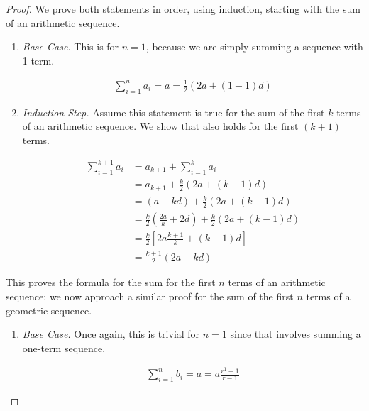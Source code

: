 \begin{proof}
	We prove both statements in order, using induction, starting with the sum of an arithmetic sequence.
	
	\vspace{\baselineskip}
	\begin{enumerate}
		\item \emph{Base Case.} This is for $n = 1$, because we are simply summing a sequence with 1 term.
		
		\begin{align*}
			\sum_{i = 1}^n a_i = a = \frac{1}{2} (2a + (1 - 1)d)
		\end{align*}
		
		\item \emph{Induction Step.} Assume this statement is true for the sum of the first $k$ terms of an arithmetic sequence. We show that also holds for the first $(k + 1)$ terms.
		
		\begin{align*}
			\sum_{i = 1}^{k + 1} a_i &=  a_{k + 1} + \sum_{i = 1}^k a_i \\
			&= a_{k + 1} + \frac{k}{2} \left( 2a + (k - 1)d \right) \\
			&= (a + kd) + \frac{k}{2} \left( 2a + (k - 1)d \right) \\
			&= \frac{k}{2} \left( \frac{2a}{k} + 2d \right) + \frac{k}{2} \left( 2a + (k - 1)d \right) \\
			&= \frac{k}{2} \left[ 2a \frac{k + 1}{k} + (k + 1)d
			 \right] \\
			&= \frac{k + 1}{2} \left( 2a + kd \right)
		\end{align*}
	\end{enumerate}
	\vspace{\baselineskip}
	
	This proves the formula for the sum for the first $n$ terms of an arithmetic sequence; we now approach a similar proof for the sum of the first $n$ terms of a geometric sequence.
	
	\vspace{\baselineskip}
	\begin{enumerate}
		\item \emph{Base Case.} Once again, this is trivial for $n = 1$ since that involves summing a one-term sequence.
		
		\begin{align*}
			\sum_{i = 1}^n b_i = a = a \frac{r^1 - 1}{r - 1}
		\end{align*}
		

\end{enumerate}
\end{proof}

